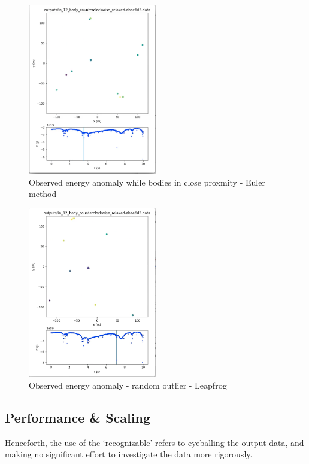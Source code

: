 \documentclass[11pt,a4paper]{article}
\begin{document}
\begin{figure}[b]
\caption{Observed energy anomaly while bodies in close proxmity - Euler method}
\centering
\includegraphics[width=0.5\textwidth]{euler_relaxed_energy_anomaly}
\end{figure} 

\begin{figure}[b]
\caption{Observed energy anomaly - random outlier - Leapfrog}
\centering
\includegraphics[width=0.5\textwidth]{relaxed_energy_anomaly}
\end{figure} 

\subsection*{Performance \& Scaling}

Henceforth, the use of the `recognizable' refers to eyeballing the output data, and making no significant effort to investigate the data more rigorously.
\end{document}
